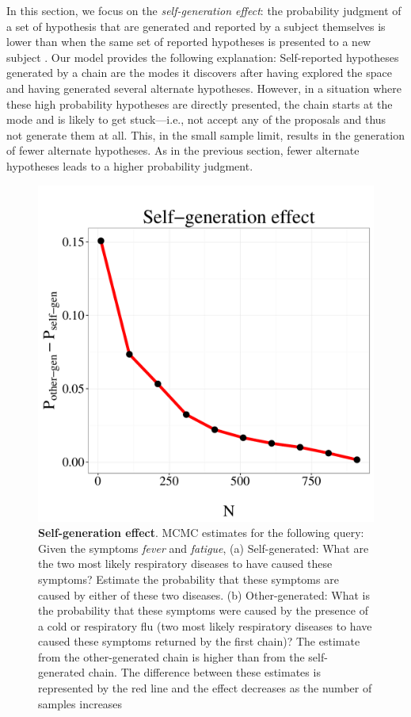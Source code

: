 In this section, we focus on the \emph{self-generation effect}: the probability judgment of a set of hypothesis that are generated and reported by a subject themselves is lower than when the same set of reported hypotheses is presented to a new subject \citep{conf,koriat1980}. Our model provides the following explanation: Self-reported hypotheses generated by a chain are the modes it discovers after having explored the space and having generated several alternate hypotheses. However, in a situation where these high probability hypotheses are directly presented, the chain starts at the mode and is likely to get stuck---i.e., not accept any of the proposals and thus not generate them at all. This, in the small sample limit, results in the generation of fewer alternate hypotheses. As in the previous section, fewer alternate hypotheses leads to a higher probability judgment.

\begin{figure}
\centering
\includegraphics[scale = 0.5]{figures/confidence.pdf}
\caption{\textbf{Self-generation effect}. MCMC estimates for the following query: Given the symptoms \emph{fever} and \emph{fatigue}, (a) Self-generated: What are the two most likely respiratory diseases to have caused these symptoms? Estimate the probability that these symptoms are caused by either of these two diseases. (b) Other-generated: What is the probability that these symptoms were caused by the presence of a cold or respiratory flu (two most likely respiratory diseases to have caused these symptoms returned by the first chain)? The estimate from the other-generated chain is higher than from the self-generated chain. The difference between these estimates is represented by the red line and the effect decreases as the number of samples increases}
\label{fig:conf}
\end{figure}

